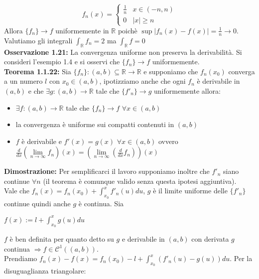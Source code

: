 \documentclass[a4paper,11pt,titlepage]{book}
\begin{document}
$$f_{n}(x)=\begin{cases} \frac{1}{n} &  x\in (-n,n) \\ 0 & |x|\geq n \end{cases}$$ Allora $\{f_{n}\}\rightarrow f$ uniformemente in $\mathbb{R}$ poichè $\sup |f_{n}(x)-f(x)|=\frac{1}{n} \rightarrow 0$. Valutiamo gli integrali $\int_{ \mathbb{R} }^{}f_{n}=2$ ma $\int_{\mathbb{R}}^{}f=0$\\

\textbf{Osservazione 1.21:} La convergenza uniforme non preserva la derivabilità. Si consideri l'esempio 1.4 e si osservi che  $\{f_{n}\}\rightarrow f$ uniformemente.\\

\textbf{Teorema 1.1.22:} Sia $\{f_{n}\}:(a,b)\subseteq \mathbb{R} \rightarrow\mathbb{R}$ e supponiamo che $f_{n}(x_0)$ converga a un numero $l$ con $x_0\in (a,b)$, ipotizziamo anche che ogni $f_{n}$ è derivabile in $(a,b)$  e che $\exists g:(a,b)\rightarrow\mathbb{R}$ tale che $\{f'_{n}\}\rightarrow g$ uniformemente allora:\begin{itemize}
\item $\exists f:(a,b)\rightarrow\mathbb{R}$ tale che $\{f_{n}\}\rightarrow f$ $\forall{x}\in (a,b)$
\item la convergenza è uniforme sui compatti contenuti in $(a,b)$
\item $f$ è derivabile e $f'(x)=g(x)$ $\forall{x}\in (a,b)$ ovvero $\frac{d}{dx}(\lim\limits_{n \to \infty}f_{n})(x)=(\lim\limits_{n \to \infty}(\frac{d}{dx}f_{n}))(x)$\\
\end{itemize}

\textbf{Dimostrazione:} Per semplificarci il lavoro supponiamo inoltre che $f'_{n}$ siano continue $\forall{n}$ (il teorema è comunque valido senza questa ipotesi aggiuntiva).\\

Vale che $f_{n}(x)=f_{n}(x_0)+\int_{x_0}^{x}f'_{n}(u)du$, $g$ è il limite uniforme delle $\{f'_{n}\}$ continue quindi anche $g$ è continua. Sia 

\begin{center}
$f(x):=l+\int_{x_0}^{x}g(u)du$
\end{center}

$f$ è ben definita per quanto detto su $g$ e derivabile in $(a,b)$ con derivata $g$ continua $\Rightarrow f\in\mathcal{C}^1((a,b))$.\\

Prendiamo $f_{n}(x)-f(x)=f_{n}(x_0)-l+\int_{x_0}^{x}(f'_{n}(u)-g(u))du$. Per la disuguaglianza triangolare:
\end{document}
